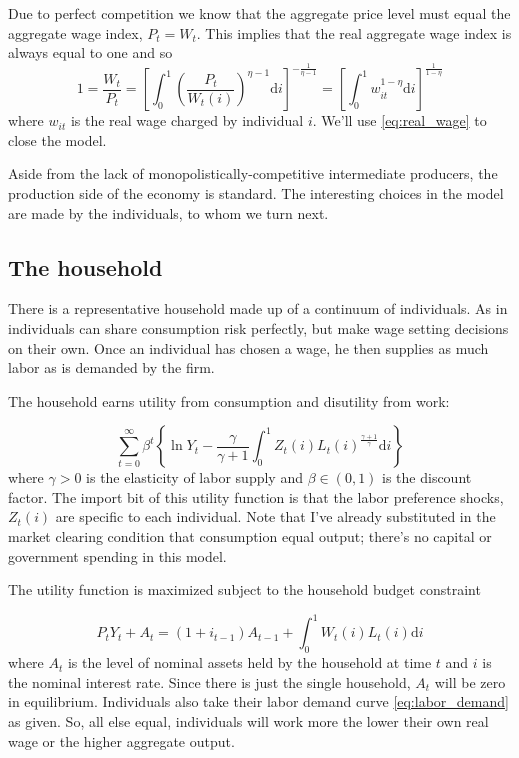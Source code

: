 \documentclass[12pt,a4paper]{scrartcl}            %
\begin{document}
Due to perfect competition we know that the aggregate price level must equal the aggregate wage index, $P_t = W_t$.  This implies that the real aggregate wage index is always equal to one and so
%
\begin{equation} \label{eq:real_wage}
    1 = \frac{W_t}{P_t} = \left[\int_{0}^{1} \left( \frac{P_t}{W_t(i)} \right)^{\eta - 1} \mathrm{d}i \right]^{-\frac{1}{\eta - 1} } = \left[\int_{0}^{1} \! w_{it}^{1 - \eta} \mathrm{d}i \right]^{ \frac{1}{1 - \eta} }
\end{equation}
%
where $w_{it}$ is the real wage charged by individual $i$.
We'll use \eqref{eq:real_wage} to close the model.

Aside from the lack of monopolistically-competitive intermediate producers, the production side of the economy is standard.
The interesting choices in the model are made by the individuals, to whom we turn next.

\subsection{The household}
\label{sub:The household}

There is a representative household made up of a continuum of individuals.
As in \cite{erceg_henderson_levin_1999} individuals can share consumption risk perfectly, but make wage setting decisions on their own.
Once an individual has chosen a wage, he then supplies as much labor as is demanded by the firm.

The household earns utility from consumption and disutility from work:

\begin{equation} \label{eq:utility}
    \sum_{t=0}^{\infty} \beta^t \left\{\ln Y_t - \frac{\gamma}{\gamma + 1} \int_{0}^{1} Z_t(i)L_t(i)^{\frac{\gamma + 1}{\gamma}}\mathrm{d}i\right\}
\end{equation}
%
where $\gamma > 0$ is the elasticity of labor supply and $\beta \in (0, 1)$ is the discount factor.
The import bit of this utility function is that the labor preference shocks, $Z_t(i)$ are specific to each individual.
Note that I've already substituted in the market clearing condition that consumption equal output;
there's no capital or government spending in this model.

The utility function is maximized subject to the household budget constraint

\begin{equation}
    \label{eq:budget}
    P_t Y_t + A_t = \left(1 + i_{t-1}\right)A_{t-1} + \int_{0}^{1}\! W_t(i)L_t(i)\mathrm{d}i
\end{equation}
%
where $A_t$ is the level of nominal assets held by the household at time $t$ and $i$ is the nominal interest rate.
Since there is just the single household, $A_t$ will be zero in equilibrium.
Individuals also take their labor demand curve \eqref{eq:labor_demand} as given.
So, all else equal, individuals will work more the lower their own real wage or the higher aggregate output.
\end{document}
